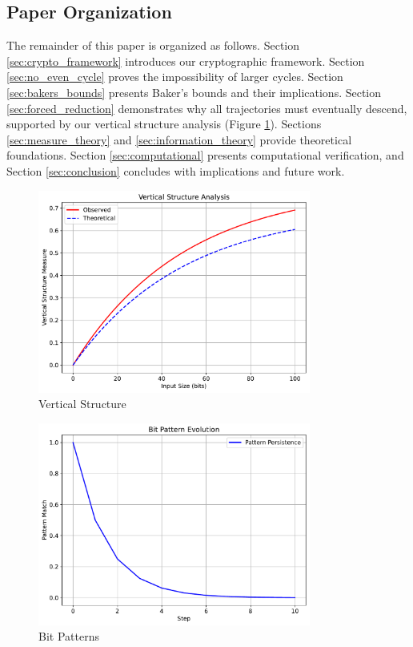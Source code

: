 \subsection{Paper Organization}
The remainder of this paper is organized as follows. Section \ref{sec:crypto_framework} introduces our cryptographic framework. Section \ref{sec:no_even_cycle} proves the impossibility of larger cycles. Section \ref{sec:bakers_bounds} presents Baker's bounds and their implications. Section \ref{sec:forced_reduction} demonstrates why all trajectories must eventually descend, supported by our vertical structure analysis (Figure \ref{fig:vertical_structure_intro}). Sections \ref{sec:measure_theory} and \ref{sec:information_theory} provide theoretical foundations. Section \ref{sec:computational} presents computational verification, and Section \ref{sec:conclusion} concludes with implications and future work.

\begin{figure}[h]
\centering
\includegraphics[width=0.8\textwidth]{py_visuals/figures/vertical_structure.pdf}
\caption{Vertical Structure}
\label{fig:vertical_structure_intro}
\end{figure}

\begin{figure}[h]
\centering
\includegraphics[width=0.8\textwidth]{py_visuals/figures/bit_patterns.pdf}
\caption{Bit Patterns}
\label{fig:bit_patterns_intro}
\end{figure}

